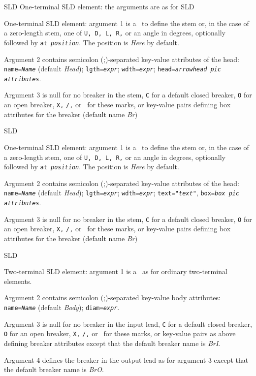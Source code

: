 %
  {SLD}%
  {One-terminal SLD element: the arguments are as for 
   }%
%
  {SLD}%
  {One-terminal SLD element: argument 1 is a \linespec\ to define the stem
   or, in the case of a zero-length stem, one of {\tt U, D, L, R,} or an
   angle in degrees, optionally followed by {\tt at {\sl position}}.
   The position is {\sl Here} by default.

   Argument 2 contains semicolon (;)-separated key-value attributes
   of the head:
   {\tt name={\sl{}Name}} (default {\sl Head});
   {\tt lgth={\sl{}expr}};
   {\tt wdth={\sl{}expr}};
   {\tt head={\sl{}arrowhead pic attributes}}.

   Argument 3 is null for no breaker in the stem, {\tt C} for a default
   closed breaker, {\tt O} for an open breaker, {\tt X,} {\tt /,} or \bsl\ for
   these marks, or
   key-value pairs defining box attributes for the breaker
   (default name {\sl Br})
   }%
%
  {SLD}%
  {One-terminal SLD element: argument 1 is a \linespec\ to define the stem
   or, in the case of a zero-length stem, one of {\tt U, D, L, R,} or an
   angle in degrees, optionally followed by {\tt at {\sl position}}.
   The position is {\sl Here} by default.

   Argument 2 contains semicolon (;)-separated key-value attributes
   of the head:
   {\tt name={\sl{}Name}} (default {\sl Head});
   {\tt lgth={\sl{}expr}};
   {\tt wdth={\sl{}expr}};
   {\tt text="{\sl{}text}"},
   {\tt box={\sl{}box pic attributes}}.

   Argument 3 is null for no breaker in the stem, {\tt C} for a default
   closed breaker, {\tt O} for an open breaker, {\tt X,} {\tt /,} or \bsl\ for
   these marks, or
   key-value pairs defining box attributes for the breaker
   (default name {\sl Br})
   }%
%
  {SLD}%
  {Two-terminal SLD element: argument 1 is a \linespec\ as for ordinary
   two-terminal elements.

   Argument 2 contains semicolon (;)-separated key-value body attributes:
   {\tt name={\sl{}Name}} (default {\sl Body});
   {\tt diam={\sl{}expr}}.

   Argument 3 is null for no breaker in the input lead, {\tt C} for a default
   closed breaker, {\tt O} for an open breaker, {\tt X,} {\tt /,} or \bsl\ for
   these marks, or key-value pairs as above defining breaker attributes
   except that the default breaker name is {\sl BrI}.

   Argument 4 defines the breaker in the output lead as for argument 3
   except that the default breaker name is {\sl BrO}.
   }%
